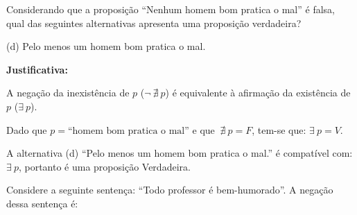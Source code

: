 \documentclass[12pt, a4paper, onecolumn]{exam}
\begin{document}
\begin{questions}

    \question[q1] Considerando que a proposição “Nenhum homem bom pratica o mal” é falsa, qual das seguintes alternativas apresenta uma proposição verdadeira?
    
    
    \begin{solution}
        (d) Pelo menos um homem bom pratica o mal.

        \textbf{Justificativa:}
        
        A negação da inexistência de \(p\) (\( \neg \ \nexists \ p \)) é equivalente à afirmação da existência de \(p\) (\( \exists \ p \)).

        Dado que \(p = \text{“homem bom pratica o mal”} \) e que \( \ \nexists \ p = F\), tem-se que: \( \exists \ p  = V\).

        A alternativa (d) “Pelo menos um homem bom pratica o mal.” é compatível com: \(\exists \ p\), portanto é uma proposição Verdadeira. 
        
    \end{solution}
    
    \question[q2] Considere a seguinte sentença: “Todo professor é bem-humorado”. A negação dessa sentença é:
    
    \begin{parts}

\end{parts}
\end{questions}
\end{document}
